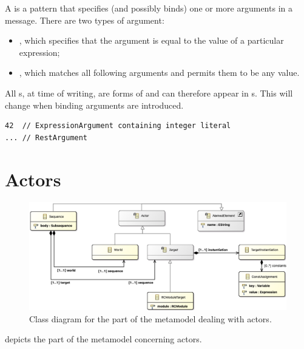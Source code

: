 A \margument{} is a pattern that specifies (and possibly binds) one or more
arguments in
a message.  There are two types of argument:

\begin{itemize}
\item
	\mexpressionargument, which specifies that the argument is equal to the
	value of a particular \robochart{} expression;
\item
	\mrestargument, which matches all following arguments and permits them to
	be any value.
\end{itemize}

All \margument s, at time of writing, are forms of \mnonbindingargument{} and
can therefore appear in \mgapmessagespec s.  This will change when binding
arguments are introduced.

\begin{lstlisting}[style=Example]
42  // ExpressionArgument containing integer literal
... // RestArgument
\end{lstlisting}

\section{Actors}\label{sec:metamodel-actors}

\begin{figure}
	\centering
	\includegraphics[width=\textwidth]{diagrams/actors.png}
	\caption{Class diagram for the part of the \langname{} metamodel dealing with actors.}
	\label{fig:metamodel-actors}
\end{figure}

 depicts the part of the metamodel concerning
actors.

